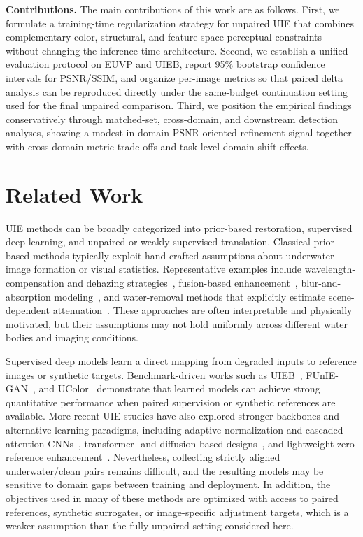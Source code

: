 \documentclass[final,1p,times]{elsarticle}
\begin{document}
\noindent\textbf{Contributions.} The main contributions of this work are as follows. First, we formulate a training-time regularization strategy for unpaired UIE that combines complementary color, structural, and feature-space perceptual constraints without changing the inference-time architecture. Second, we establish a unified evaluation protocol on EUVP and UIEB, report 95\% bootstrap confidence intervals for PSNR/SSIM, and organize per-image metrics so that paired delta analysis can be reproduced directly under the same-budget continuation setting used for the final unpaired comparison. Third, we position the empirical findings conservatively through matched-set, cross-domain, and downstream detection analyses, showing a modest in-domain PSNR-oriented refinement signal together with cross-domain metric trade-offs and task-level domain-shift effects.

\section{Related Work}
UIE methods can be broadly categorized into prior-based restoration, supervised deep learning, and unpaired or weakly supervised translation. Classical prior-based methods typically exploit hand-crafted assumptions about underwater image formation or visual statistics. Representative examples include wavelength-compensation and dehazing strategies~\cite{chiang2012wavelength}, fusion-based enhancement~\cite{ancuti2012fusion}, blur-and-absorption modeling~\cite{peng2017blurriness}, and water-removal methods that explicitly estimate scene-dependent attenuation~\cite{akkaynak2019seathru}. These approaches are often interpretable and physically motivated, but their assumptions may not hold uniformly across different water bodies and imaging conditions.

Supervised deep models learn a direct mapping from degraded inputs to reference images or synthetic targets. Benchmark-driven works such as UIEB~\cite{li2020uieb}, FUnIE-GAN~\cite{islam2020funiegan}, and UColor~\cite{li2021ucolor} demonstrate that learned models can achieve strong quantitative performance when paired supervision or synthetic references are available. More recent UIE studies have also explored stronger backbones and alternative learning paradigms, including adaptive normalization and cascaded attention CNNs~\cite{park2024asnet,zhang2024cnms}, transformer- and diffusion-based designs~\cite{tang2023diffusion,ding2025aldiff}, and lightweight zero-reference enhancement~\cite{liu2024zerouae}. Nevertheless, collecting strictly aligned underwater/clean pairs remains difficult, and the resulting models may be sensitive to domain gaps between training and deployment. In addition, the objectives used in many of these methods are optimized with access to paired references, synthetic surrogates, or image-specific adjustment targets, which is a weaker assumption than the fully unpaired setting considered here.
\end{document}
